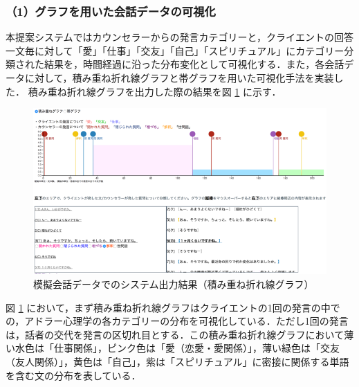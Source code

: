 \documentclass[shuuron]{kuee}
\begin{document}
\subsubsection{（1）グラフを用いた会話データの可視化}
本提案システムではカウンセラーからの発言カテゴリーと，クライエントの回答一文毎に対して「愛」「仕事」「交友」「自己」「スピリチュアル」にカテゴリー分類された結果を，時間経過に沿った分布変化として可視化する．また，各会話データに対して，積み重ね折れ線グラフと帯グラフを用いた可視化手法を実装した．
積み重ね折れ線グラフを出力した際の結果を図
\ref{fig:6_1}
に示す．
\begin{figure}
  \begin{center}
    \includegraphics[width=\linewidth]{6_1.png}
  \end{center}
  \caption{模擬会話データでのシステム出力結果（積み重ね折れ線グラフ）}
  \label{fig:6_1}
\end{figure}




図
\ref{fig:6_1}
において，まず積み重ね折れ線グラフはクライエントの1回の発言の中での，アドラー心理学の各カテゴリーの分布を可視化している．ただし1回の発言は，話者の交代を発言の区切れ目とする．この積み重ね折れ線グラフにおいて薄い水色は「仕事関係」，ピンク色は「愛（恋愛・愛関係）」，薄い緑色は「交友（友人関係）」，黄色は「自己」，紫は「スピリチュアル」に密接に関係する単語を含む文の分布を表している．
\end{document}
